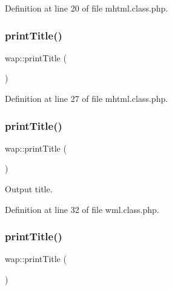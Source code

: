 Definition at line 20 of file mhtml.\+class.\+php.

\mbox{\label{classwap_a048fa1324853c9d69e795c7d34f7ad8b}} 
\subsubsection{\texorpdfstring{print\+Title()}{printTitle()}\hspace{0.1cm}{\footnotesize\ttfamily [1/3]}}
{\footnotesize\ttfamily wap\+::print\+Title (\begin{DoxyParamCaption}{ }\end{DoxyParamCaption})}



Definition at line 27 of file mhtml.\+class.\+php.

\mbox{\label{classwap_a048fa1324853c9d69e795c7d34f7ad8b}} 
\subsubsection{\texorpdfstring{print\+Title()}{printTitle()}\hspace{0.1cm}{\footnotesize\ttfamily [2/3]}}
{\footnotesize\ttfamily wap\+::print\+Title (\begin{DoxyParamCaption}{ }\end{DoxyParamCaption})}



Output title. 



Definition at line 32 of file wml.\+class.\+php.

\mbox{\label{classwap_a048fa1324853c9d69e795c7d34f7ad8b}} 
\subsubsection{\texorpdfstring{print\+Title()}{printTitle()}\hspace{0.1cm}{\footnotesize\ttfamily [3/3]}}
{\footnotesize\ttfamily wap\+::print\+Title (\begin{DoxyParamCaption}{ }\end{DoxyParamCaption})}



